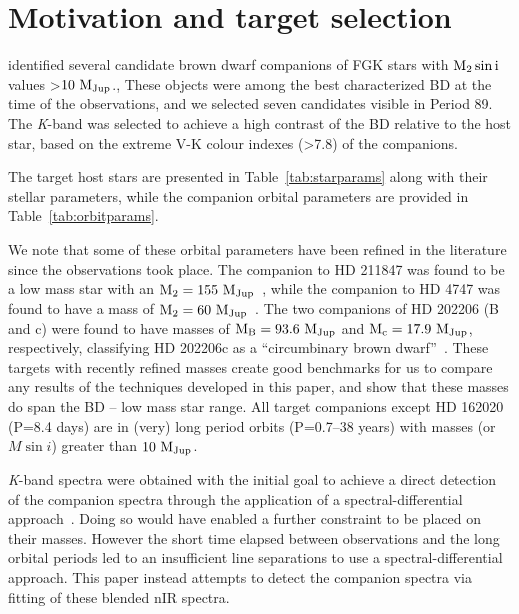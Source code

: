 \documentclass[fleqn,usenatbib]{mnras}
\newcommand*\bl{\color{blue}}
\begin{document}
    
    \section{Motivation and target selection}
    \label{sec:motivation}
    \citet{sahlmann_search_2011} identified several candidate brown dwarf companions of FGK stars with \(\rm M_2 \sin{i}\) values >\(\rm 10~M_{Jup}\).{\bl, These objects were among the best characterized BD at the time of the observations, and we selected seven candidates visible in Period 89. The \textit{K}-band was selected to achieve a high contrast of the BD relative to the host star,  based on the extreme V-K colour indexes (>7.8) of the companions}. 
    
    The target host stars are presented in Table~\ref{tab:starparams} along with their stellar parameters, while the companion orbital parameters are provided in Table~\ref{tab:orbitparams}.
    
    We note that some of these orbital parameters have been refined in the literature since the observations took place. The companion to {HD 211847} was found to be a low mass star with an \(\rm M_2=155~M_{Jup}\)~\citep{moutou_eccentricity_2017}, while the companion to {HD 4747} was found to have a mass of \(\rm M_2=60~M_{Jup}\)~\citep{crepp_trends_2016}. The two companions of {HD 202206} (B and c) were found to have masses of \(\rm M_B =93.6~M_{Jup}\) and \(\rm M_c = 17.9~M_{Jup}\), respectively, classifying {HD 202206}c as a ``circumbinary brown dwarf''~\citep{benedict_hd_2017}. These targets with recently refined masses create good benchmarks for us to compare any results of the techniques developed in this paper, and show that these masses do span the BD -- low mass star range. All target companions except {HD 162020} (P=8.4 days) are in (very) long period orbits (P=0.7--38 years) with masses (or \(M\sin{i}\)) greater than \(\rm 10~M_{Jup}\).
    
    {\bl \textit{K}-band spectra were obtained with the initial goal to achieve a direct detection of the companion spectra through the application of a spectral-differential approach~\citep[e.g.][]{ferluga_separating_1997, kostogryz_spectral_2013}. Doing so would have enabled a further constraint to be placed on their masses.  However the short time elapsed between observations and the long orbital periods led to an insufficient line separations to use a spectral-differential approach. This paper instead attempts to detect the companion spectra via fitting of these blended nIR spectra.}
    
\end{document}
